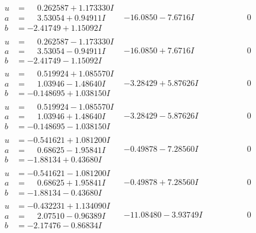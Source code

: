\documentclass[1p]{elsarticle_modified}
\theoremstyle{definition}
\begin{document}
$$\begin{array}{c|c|c}
\begin{aligned}
u &= \phantom{-}0.262587 + 1.173330 I \\
a &= \phantom{-}3.53054 + 0.94911 I \\
b &= -2.41749 + 1.15092 I\end{aligned}
 & -16.0850 - 7.6716 I & \phantom{-0.000000 } 0 \\ \hline\begin{aligned}
u &= \phantom{-}0.262587 - 1.173330 I \\
a &= \phantom{-}3.53054 - 0.94911 I \\
b &= -2.41749 - 1.15092 I\end{aligned}
 & -16.0850 + 7.6716 I & \phantom{-0.000000 } 0 \\ \hline\begin{aligned}
u &= \phantom{-}0.519924 + 1.085570 I \\
a &= \phantom{-}1.03946 - 1.48640 I \\
b &= -0.148695 + 1.038150 I\end{aligned}
 & -3.28429 + 5.87626 I & \phantom{-0.000000 } 0 \\ \hline\begin{aligned}
u &= \phantom{-}0.519924 - 1.085570 I \\
a &= \phantom{-}1.03946 + 1.48640 I \\
b &= -0.148695 - 1.038150 I\end{aligned}
 & -3.28429 - 5.87626 I & \phantom{-0.000000 } 0 \\ \hline\begin{aligned}
u &= -0.541621 + 1.081200 I \\
a &= \phantom{-}0.68625 - 1.95841 I \\
b &= -1.88134 + 0.43680 I\end{aligned}
 & -0.49878 - 7.28560 I & \phantom{-0.000000 } 0 \\ \hline\begin{aligned}
u &= -0.541621 - 1.081200 I \\
a &= \phantom{-}0.68625 + 1.95841 I \\
b &= -1.88134 - 0.43680 I\end{aligned}
 & -0.49878 + 7.28560 I & \phantom{-0.000000 } 0 \\ \hline\begin{aligned}
u &= -0.432231 + 1.134090 I \\
a &= \phantom{-}2.07510 - 0.96389 I \\
b &= -2.17476 - 0.86834 I\end{aligned}
 & -11.08480 - 3.93749 I & \phantom{-0.000000 } 0 \\ \hline\begin{aligned}

\end{aligned}
\end{array}$$
\end{document}
